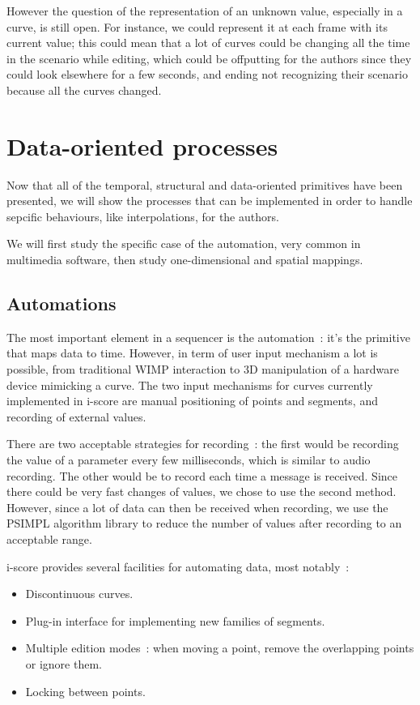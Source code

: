 \documentclass{sigchi}
\begin{document}
However the question of the representation of an unknown value, especially in a curve, is still open. For instance, we could represent it at each frame with its current value; this could mean that a lot of curves could be changing all the time in the scenario while editing, which could be offputting for the authors since they could look elsewhere for a few seconds, and ending not recognizing their scenario because all the curves changed. 


\section{Data-oriented processes}
Now that all of the temporal, structural and data-oriented primitives have been presented, we will show the processes that can be implemented in order to handle sepcific behaviours, like interpolations, for the authors.

We will first study the specific case of the automation, very common in multimedia software, then study one-dimensional and spatial mappings.

\subsection{Automations}
The most important element in a sequencer is the automation~: it's the primitive that maps data to time. However, in term of user input mechanism a lot is possible, from traditional WIMP interaction\cite{cohen1999interface} to 3D manipulation of a hardware device mimicking a curve\cite{grossman2003interface}. The two input mechanisms for curves currently implemented in i-score are manual positioning of points and segments, and recording of external values. 

There are two acceptable strategies for recording~: the first would be recording the value of a parameter every few milliseconds, which is similar to audio recording. The other would be to record each time a message is received. Since there could be very fast changes of values, we chose to use the second method.
However, since a lot of data can then be received when recording, we use the PSIMPL\cite{psimpl} algorithm library to reduce the number of values after recording to an acceptable range.

i-score provides several facilities for automating data, most notably~: 
\begin{itemize}
    \item Discontinuous curves.
    \item Plug-in interface for implementing new families of segments.
    \item Multiple edition modes~: when moving a point, remove the overlapping points or ignore them.
    \item Locking between points.
\end{itemize}
\end{document}
